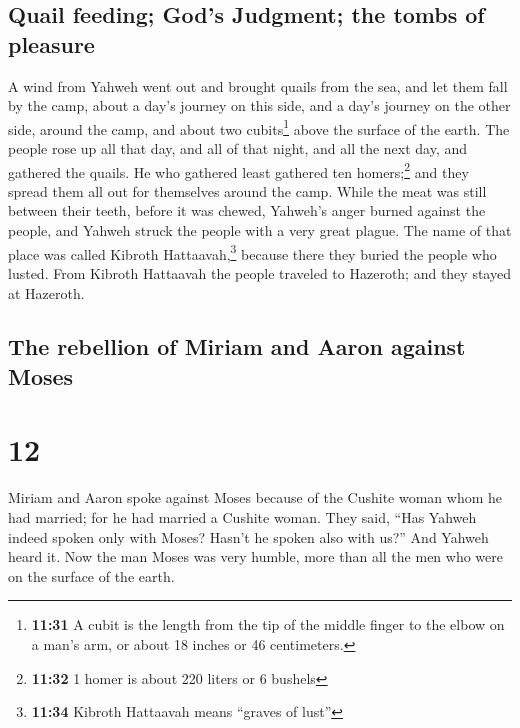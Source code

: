 \hypertarget{quail-feeding-gods-judgment-the-tombs-of-pleasure}{%
\subsection{Quail feeding; God's Judgment; the tombs of
pleasure}\label{quail-feeding-gods-judgment-the-tombs-of-pleasure}}

 A wind from Yahweh went out and brought quails from the
sea, and let them fall by the camp, about a day's journey on this side,
and a day's journey on the other side, around the camp, and about two
cubits\footnote{\textbf{11:31} A cubit is the length from the tip of the
  middle finger to the elbow on a man's arm, or about 18 inches or 46
  centimeters.} above the surface of the earth.  The
people rose up all that day, and all of that night, and all the next
day, and gathered the quails. He who gathered least gathered ten
homers;\footnote{\textbf{11:32} 1 homer is about 220 liters or 6 bushels}
and they spread them all out for themselves around the camp.
 While the meat was still between their teeth, before it
was chewed, Yahweh's anger burned against the people, and Yahweh struck
the people with a very great plague.  The name of that
place was called Kibroth Hattaavah,\footnote{\textbf{11:34} Kibroth
  Hattaavah means ``graves of lust''} because there they buried the
people who lusted.  From Kibroth Hattaavah the people
traveled to Hazeroth; and they stayed at Hazeroth.

\hypertarget{the-rebellion-of-miriam-and-aaron-against-moses}{%
\subsection{The rebellion of Miriam and Aaron against
Moses}\label{the-rebellion-of-miriam-and-aaron-against-moses}}

\hypertarget{section-11}{%
\section{12}\label{section-11}}

 Miriam and Aaron spoke against Moses because of the
Cushite woman whom he had married; for he had married a Cushite woman.
 They said, ``Has Yahweh indeed spoken only with Moses?
Hasn't he spoken also with us?'' And Yahweh heard it.  Now
the man Moses was very humble, more than all the men who were on the
surface of the earth.

